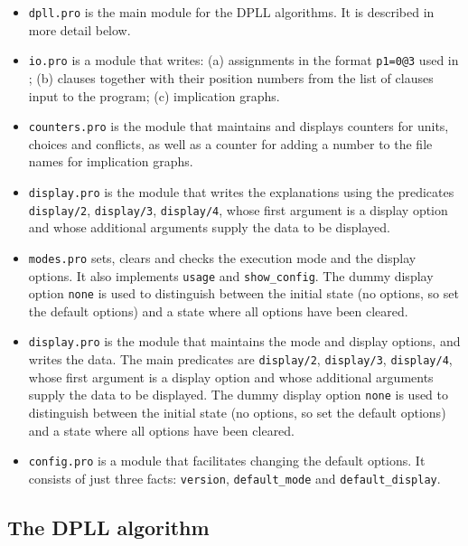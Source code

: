 \documentclass[11pt]{article}
\newcommand*{\p}[1]{\textup{\texttt{#1}}}
\begin{document}
\begin{itemize}
\item \p{dpll.pro} is the main module for the DPLL algorithms. It is
described in more detail below.

\item \p{io.pro} is a module that writes: (a) assignments in the format
\p{p1=0@3} used in \cite{mlm}; (b) clauses together with their position
numbers from the list of clauses input to the program; (c) implication
graphs.

\item \p{counters.pro} is the module that maintains and displays counters
for units, choices and conflicts, as well as a counter for adding a
number to the file names for implication graphs.

\item \p{display.pro} is the module that writes the explanations using
the predicates \p{display/2},
\p{display/3}, \p{display/4}, whose first argument is a display option
and whose additional arguments supply the data to be displayed.

\item \p{modes.pro} sets, clears and checks the execution mode and the
display options. It also implements \p{usage} and \p{show\_config}. The
dummy display option \p{none} is used to distinguish between the initial
state (no options, so set the default options) and a state where all
options have been cleared.

\item \p{display.pro} is the module that maintains the mode and display
options, and writes the data. The main predicates are \p{display/2},
\p{display/3}, \p{display/4}, whose first argument is a display option
and whose additional arguments supply the data to be displayed. The
dummy display option \p{none} is used to distinguish between the initial
state (no options, so set the default options) and a state where all
options have been cleared.

\item \p{config.pro} is a module that facilitates changing the default
options. It consists of just three facts: \p{version}, \p{default\_mode}
and \p{default\_display}.

\end{itemize}

\subsection{The DPLL algorithm}
\end{document}
